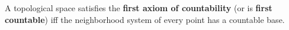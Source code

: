 A topological space satisfies the \textbf{first axiom of countability} (or is \textbf{first countable}) iff the neighborhood system of every point has a countable base.
